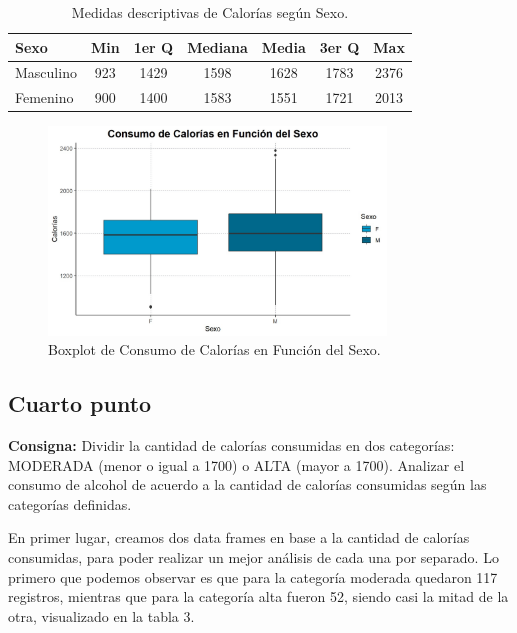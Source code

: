 \documentclass{article} %
\begin{document}
\begin{table}[H]
	\centering
		\begin{tabular}{||l || c | c | c | c | c | c ||}
			\hline
			\hline
			Sexo & Min & 1er Q & Mediana & Media & 3er Q  & Max\\
			\hline			
			\hline
			Masculino & 923 & 1429 & 1598 & 1628 & 1783 & 2376\\
			\hline
			Femenino & 900 & 1400 & 1583 & 1551 & 1721 & 2013\\
			\hline
			\hline
		\end{tabular}
		\caption{Medidas descriptivas de Calorías según Sexo.}
	\label{tab:table-punto-1-3}
\end{table}

\begin{figure}[H]
	\centering
	\includegraphics[width=0.8\textwidth]{images/1-3 Boxplot}
	\caption{Boxplot de Consumo de Calorías en Función del Sexo.}
	\label{fig:boxplot1}
\end{figure}

\subsection{Cuarto punto}

\textbf{Consigna:} Dividir la cantidad de calorías consumidas en dos categorías: MODERADA (menor o igual a 1700) o ALTA (mayor a 1700). Analizar el consumo de alcohol de acuerdo a la cantidad de calorías consumidas según las categorías definidas.

En primer lugar, creamos dos data frames en base a la cantidad de calorías consumidas, para poder realizar un mejor análisis de cada una por separado. Lo primero que podemos observar es que para la categoría moderada quedaron 117 registros, mientras que para la categoría alta fueron 52, siendo casi la mitad de la otra, visualizado en la tabla 3.
\end{document}
